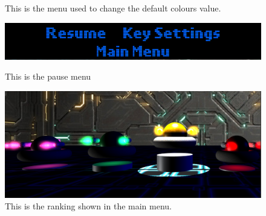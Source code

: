 \documentclass[11pt]{article}
\begin{document}
\begin{figure}
\begin{minipage}[b]{0.6\linewidth}
		\caption{This is the menu used to change the default colours value.}
		\label{fig:colorMenu}
	\end{minipage}
	\begin{minipage}[b]{0.4\linewidth}
		\includegraphics[width=\linewidth]{pauseMenu}
		\caption{This is the pause menu}
		\label{fig:endGameMenu4}
	\end{minipage}
	\begin{minipage}[b]{0.6\linewidth}
		\includegraphics[width=\linewidth]{Ranking}
		\caption{This is the ranking shown in the main menu.}
		\label{fig:Ranking}
	\end{minipage}
\end{figure}
\end{document}

